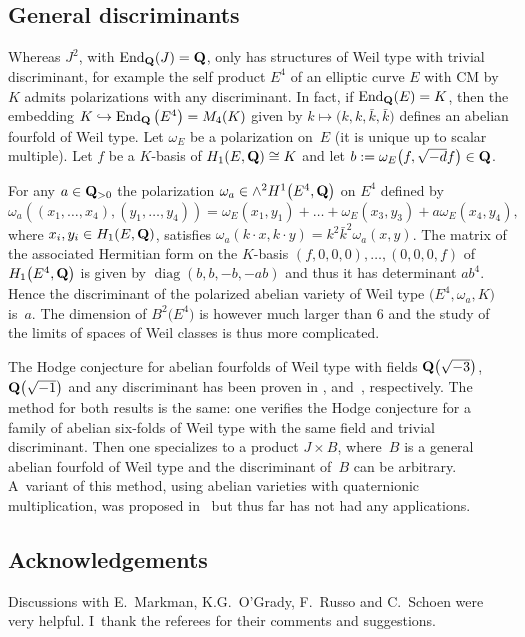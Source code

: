 \documentclass[pdftex]{sigma}
\numberwithin{equation}{section}
\begin{document}
\subsection{General discriminants} \label{gendis}
Whereas $J^2$, with $\operatorname{End}_{\bf Q}(J)={\bf Q}$, only has structures of Weil type with trivial
discriminant, for example the self product
$E^4$ of an elliptic curve $E$ with CM by $K$ admits polarizations with any discriminant.
In fact, if $\operatorname{End}_{\bf Q}(E)=K$, then the embedding
$K\hookrightarrow \operatorname{End}_{\bf Q}\big(E^4\big)=M_4(K)$ given by $k\mapsto \big(k,k,\bar{k},\bar{k}\big)$
defines an abelian fourfold of Weil type. Let $\omega_E$ be a polarization on~$E$
(it is unique up to scalar multiple). Let
$f$ be a $K$-basis of $H_1(E,{\bf Q})\cong K$ and let $b:=\omega_E\big(f,\sqrt{-d}f\big)\in{\bf Q}$.

For any $a\in{\bf Q}_{>0}$ the polarization $\omega_a\in\wedge^2H^1\big(E^4,{\bf Q}\big)$ on $E^4$ defined by
\[
\omega_a((x_1,\dots,x_4),(y_1,\dots,y_4)) = \omega_E(x_1,y_1) + \dots +
\omega_E(x_3,y_3) + a\omega_E(x_4,y_4),
\]
where $x_i,y_i\in H_1(E,{\bf Q})$, satisfies
$\omega_a(k\cdot x,k\cdot y)=k^2\bar{k}^2\omega_a(x,y)$.
The matrix of the associated Hermitian form on the $K$-basis $(f,0,0,0),\dots,(0,0,0,f)$
of $H_1\big(E^4,{\bf Q}\big)$ is given by $\operatorname{diag}(b,b,-b,-ab)$ and thus it has determinant $ab^4$.
Hence the discriminant of the polarized abelian variety of Weil type $\big(E^4,\omega_a,K\big)$ is~$a$.
The dimension of $B^2\big(E^4\big)$ is however much larger than $6$ and the study of the limits
of spaces of Weil classes is thus more complicated.

\begin{Remark} The Hodge conjecture for abelian fourfolds of Weil type with fields
${\bf Q}\big(\sqrt{-3}\big)$, ${\bf Q}\big(\sqrt{-1}\big)$ and any discriminant has been proven
in \cite{schoenhodge}, \cite{Sadd} and~\cite{Koike}, respectively.
The method for both results
is the same: one verifies the Hodge conjecture for a family of abelian six-folds of
Weil type with the same field and trivial discriminant. Then one specializes to a product
$J\times B$, where~$B$ is a general abelian fourfold of Weil type and the discriminant
of~$B$ can be arbitrary. A~variant of this method, using abelian varieties with
quaternionic multiplication, was proposed in~\cite{vGV} but thus far has not had any
applications.
\end{Remark}


\subsection*{Acknowledgements}
Discussions with E.~Markman, K.G.~O'Grady, F.~Russo and C.~Schoen were very helpful.
I~thank the referees for their comments and suggestions.
\end{document}
